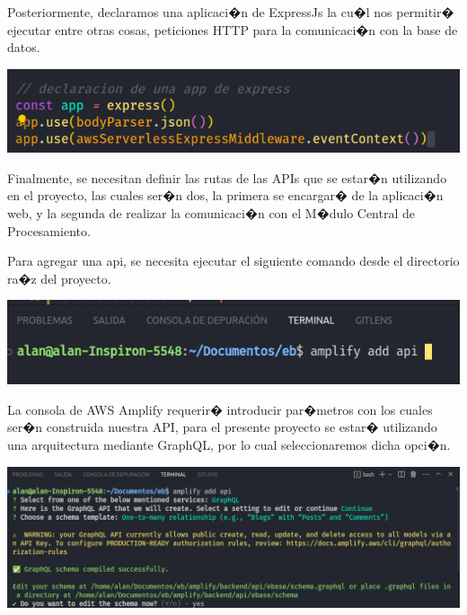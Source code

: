 \documentclass[12pt,letterpaper]{article}
\begin{document}
Posteriormente, declaramos una aplicaci�n de ExpressJs la cu�l nos permitir� ejecutar entre otras cosas, peticiones HTTP para la comunicaci�n con la base de datos.

\begin{center}
  \includegraphics[scale=0.55]{imagenes/expressjs}
 \label{fig:MongoA} 
\end{center} 

Finalmente, se necesitan definir las rutas de las APIs que se estar�n utilizando en el proyecto, las cuales ser�n dos, la primera se encargar� de la aplicaci�n web, y la segunda de realizar la comunicaci�n con el M�dulo Central de Procesamiento.

Para agregar una api, se necesita ejecutar el siguiente comando desde el directorio ra�z del proyecto.


\begin{center}
  \includegraphics[scale=0.55]{imagenes/addapi}
 \label{fig:MongoA} 
\end{center} 

La consola de AWS Amplify requerir� introducir par�metros con los cuales ser�n construida nuestra API, para el presente proyecto se estar� utilizando una arquitectura mediante GraphQL, por lo cual seleccionaremos dicha opci�n.

\begin{center}
  \includegraphics[scale=0.4]{imagenes/graphql}
 \label{fig:MongoA} 
\end{center} 
\end{document}
